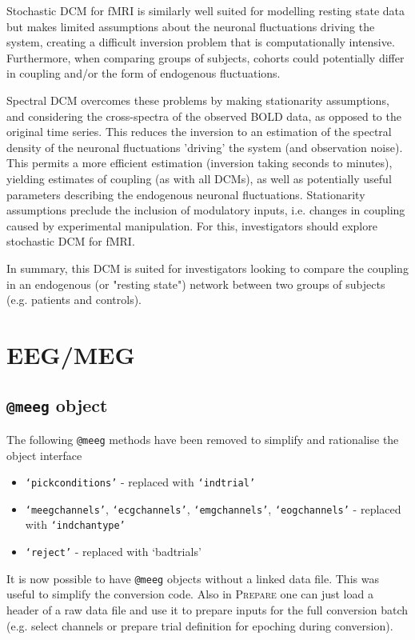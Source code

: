 \documentclass[a4paper,titlepage,openany]{article}
\begin{document}
\begin{multicols}{2}
Stochastic DCM for fMRI is similarly well suited for modelling resting state data but makes limited assumptions about the neuronal fluctuations driving the system, creating a difficult inversion problem that is computationally intensive. Furthermore, when comparing groups of subjects, cohorts could potentially differ in coupling and/or the form of endogenous fluctuations.

Spectral DCM overcomes these problems by making stationarity assumptions, and considering the cross-spectra of the observed BOLD data, as opposed to the original time series. This reduces the inversion to an estimation of the spectral density of the neuronal fluctuations 'driving' the system (and observation noise). This permits a more efficient estimation (inversion taking seconds to minutes), yielding estimates of coupling (as with all DCMs), as well as potentially useful parameters describing the endogenous neuronal fluctuations. Stationarity assumptions preclude the inclusion of modulatory inputs, i.e. changes in coupling caused by experimental manipulation. For this, investigators should explore stochastic DCM for fMRI.

In summary, this DCM is suited for investigators looking to compare the coupling in an endogenous (or "resting state") network between two groups of subjects (e.g. patients and controls).

\section{EEG/MEG}

\subsection{\texttt{@meeg} object}

The following \texttt{@meeg} methods have been removed to simplify and rationalise the object interface
\begin{itemize}
\item \texttt{`pickconditions'} - replaced with \texttt{`indtrial'}
\item \texttt{`meegchannels'}, \texttt{`ecgchannels'}, \texttt{`emgchannels'},  \texttt{`eogchannels'} - replaced with \texttt{`indchantype'}
\item \texttt{`reject'} - replaced with {`badtrials'}
\end{itemize}

It is now possible to have \texttt{@meeg} objects without a linked data file. This was useful to simplify the conversion code. Also in \textsc{Prepare} one can just load a header of a raw data file and use it to prepare inputs for the full conversion batch (e.g. select channels or prepare trial definition for epoching during conversion).


\end{multicols}
\end{document}
